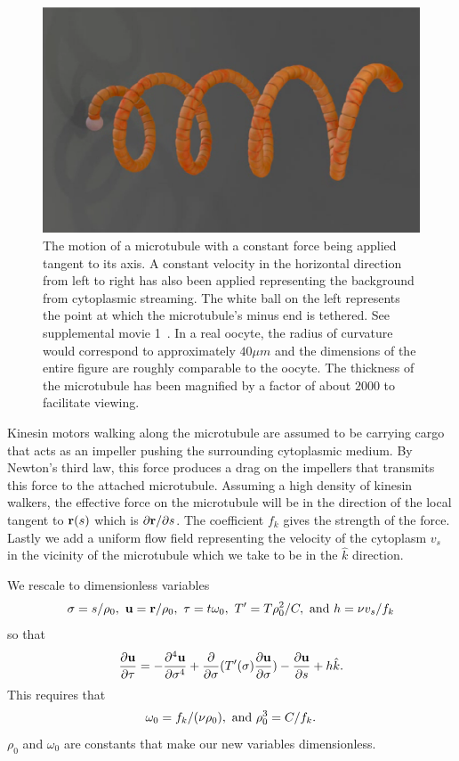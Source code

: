 \documentclass[11pt]{ucthesis}
\def\br{{\bf r}}
\def\bu{{\bf u}}
\begin{document}
\begin{figure}[htp]
\begin{center}
\includegraphics[width=\hsize]{simulation1.eps}
\caption{ 
The motion of a microtubule with a constant force being applied tangent to its axis. 
A constant velocity in the horizontal direction  from left to right has also been applied representing
the background from cytoplasmic streaming. The white ball on the left represents
the point at which the microtubule's minus end is tethered. See supplemental
movie 1~\cite{SupplMovies}. In a real oocyte, the radius of curvature would
correspond to approximately $40 \mu m$ and the dimensions of the entire figure are
roughly comparable to the oocyte. The thickness of the microtubule has been magnified
by a factor of about $2000$ to facilitate viewing.
}
\label{fig:simulation}
\end{center}
\end{figure}
Kinesin motors walking along the microtubule are assumed to be carrying cargo that acts as an impeller pushing the surrounding
cytoplasmic medium. By Newton's third law, this force produces a drag on the impellers that transmits this force to the
attached microtubule. Assuming a high density of kinesin walkers, the effective force on the microtubule will be in the
direction of the local tangent to $\br(s)$ which is $\partial \br/\partial s$. The coefficient $f_k$ gives the strength of the force.
Lastly we add a uniform flow field representing the velocity of the cytoplasm $v_s$ in the vicinity of the microtubule
which we take to be in the $\hat k$ direction.

We rescale to dimensionless variables 
\begin{equation}
\label{eq:rescale}
\sigma = s/\rho_0,~ \bu = \br/\rho_0, ~ \tau = t \omega_0,  ~ T' = T \rho_0^2/C, ~{\rm and} ~ h = \nu v_s/f_k 
\end{equation}
so that
\begin{equation}
\label{eq:dimensionless}
\frac{\partial \bu}{\partial \tau} =  - \frac{\partial^4 \bu}{\partial \sigma^4} + \frac{\partial}{\partial \sigma}(T'(\sigma)\frac{\partial \bu}{\partial \sigma}) -
\frac{\partial \bu}{\partial s} + h {\hat k} .
\end{equation}
This requires that 
\begin{equation}
\label{eq:scaling}
\omega_0 = f_k/(\nu \rho_0), ~  {\rm and} ~ \rho_0^3 = C/f_k. 
\end{equation}
$\rho_0$ and $\omega_0$ are constants that make our new variables dimensionless.
\end{document}
